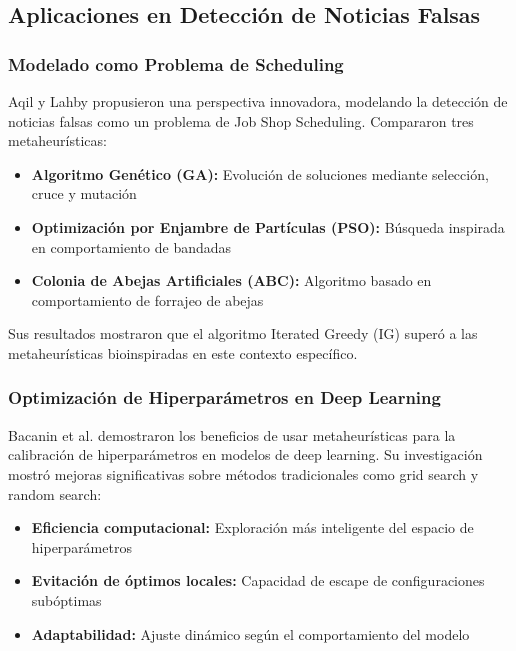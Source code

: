 \subsection{Aplicaciones en Detección de Noticias Falsas}

\subsubsection{Modelado como Problema de Scheduling}

Aqil y Lahby \cite{aqil2021modeling} propusieron una perspectiva innovadora, modelando la detección de noticias falsas como un problema de Job Shop Scheduling. Compararon tres metaheurísticas:
\begin{itemize}
    \item \textbf{Algoritmo Genético (GA):} Evolución de soluciones mediante selección, cruce y mutación
    \item \textbf{Optimización por Enjambre de Partículas (PSO):} Búsqueda inspirada en comportamiento de bandadas
    \item \textbf{Colonia de Abejas Artificiales (ABC):} Algoritmo basado en comportamiento de forrajeo de abejas
\end{itemize}

Sus resultados mostraron que el algoritmo Iterated Greedy (IG) superó a las metaheurísticas bioinspiradas en este contexto específico.

\subsubsection{Optimización de Hiperparámetros en Deep Learning}

Bacanin et al. \cite{bacanin2023benefits} demostraron los beneficios de usar metaheurísticas para la calibración de hiperparámetros en modelos de deep learning. Su investigación mostró mejoras significativas sobre métodos tradicionales como grid search y random search:

\begin{itemize}
    \item \textbf{Eficiencia computacional:} Exploración más inteligente del espacio de hiperparámetros
    \item \textbf{Evitación de óptimos locales:} Capacidad de escape de configuraciones subóptimas
    \item \textbf{Adaptabilidad:} Ajuste dinámico según el comportamiento del modelo
\end{itemize}

